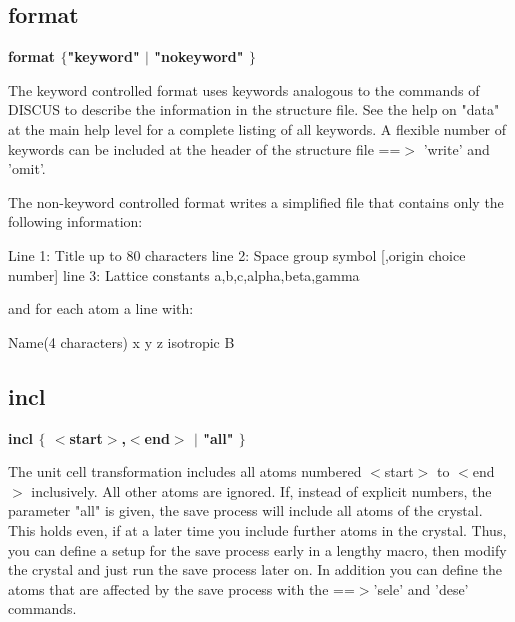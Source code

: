 \subsection*{format}
{\bf format $ \{$"keyword" $| $ "nokeyword" $\} $ \par }
\par
\vspace{3pt}
The keyword controlled format uses keywords analogous to the commands 
of DISCUS to describe the information in the structure file. See the 
help on "data" at the main help level for a complete listing of all 
keywords. A flexible number of keywords can be included at the header 
of the structure file ==$> $ 'write' and 'omit'. 
\par
The non-keyword controlled format writes a simplified file that contains 
only the following information: 
\par
\begin{MacVerbatim}
Line 1:   Title up to 80 characters
line 2:   Space group symbol [,origin choice number]
line 3:   Lattice constants a,b,c,alpha,beta,gamma
\end{MacVerbatim}
and for each atom a line with: 
\par
\begin{MacVerbatim}
          Name(4 characters) x  y  z  isotropic B
\end{MacVerbatim}
\subsection*{incl}
{\bf incl $ \{$ $ <$start$> $,$ <$end$> $ $| $ "all" $\} $ \par }
\par
\vspace{3pt}
The unit cell transformation includes all atoms numbered $ <$start$> $ to $ <$end$> $ 
inclusively. All other atoms are ignored. 
If, instead of explicit numbers, the parameter "all" is given, the 
save process will include all atoms of the crystal. This holds 
even, if at a later time you include further atoms in the crystal. 
Thus, you can define a setup for the save process early in a 
lengthy macro, then modify the crystal and just run the 
save process later on. 
In addition you can define the atoms that are affected by the 
save process with the ==$> $'sele' and 'dese' commands. 
